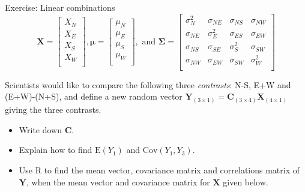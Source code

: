 \documentclass[
  ignorenonframetext,
]{beamer}
\providecommand{\tightlist}{%
  \setlength{\itemsep}{0pt}\setlength{\parskip}{0pt}}
\begin{document}
\begin{frame}
\begin{block}{Exercise: Linear combinations}
\protect\hypertarget{exercise-linear-combinations}{}
\[\boldsymbol{X}=\left[ \begin{array}{c} X_N\\
          X_E\\
X_S\\
          X_W\\
          \end{array}
          \right],
          \boldsymbol{\mu}=\left[
      \begin{array}{c} \mu_N\\
          \mu_E\\
\mu_S\\
          \mu_W\\
          \end{array}
          \right], \text{ and } \boldsymbol\Sigma=\left[ \begin{array}{cccc}
    \sigma_{N}^2 & \sigma_{NE} & \sigma_{NS} & \sigma_{NW}\\
    \sigma_{NE} & \sigma_{E}^2 & \sigma_{ES}& \sigma_{EW}\\
        \sigma_{NS} & \sigma_{SE} & \sigma_{S}^2 & \sigma_{SW}\\
    \sigma_{NW} & \sigma_{EW} & \sigma_{SW} & \sigma_{W}^2\\
\end{array} \right]\]

Scientists would like to compare the following three \emph{contrasts}:
N-S, E+W and (E+W)-(N+S), and define a new random vector
\(\boldsymbol{Y}_{(3\times 1)}=\boldsymbol{C}_{(3\times 4)} \boldsymbol{X}_{(4\times 1)}\)
giving the three contrasts.

\vspace{2mm}

\begin{itemize}
\tightlist
\item
  Write down \(\boldsymbol{C}\).
\item
  Explain how to find \(\text{E}(Y_1)\) and \(\text{Cov}(Y_1,Y_3)\).
\item
  Use R to find the mean vector, covariance matrix and correlations
  matrix of \(\boldsymbol{Y}\), when the mean vector and covariance
  matrix for \(\boldsymbol{X}\) given below.
\end{itemize}
\end{block}
\end{frame}
\end{document}
